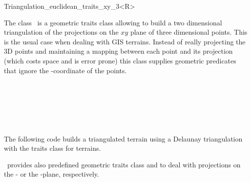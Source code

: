 

\begin{ccRefClass}{Triangulation_euclidean_traits_xy_3<R>}  %


\ccDefinition
  
The class \ccRefName\ is a geometric traits class allowing to
build a two dimensional triangulation of the projections
on the $xy$ plane  of three dimensional points.
This is the usual case when dealing with GIS terrains.
Instead of really projecting the 3D points and
maintaining a mapping between each point and its projection
 (which costs space and is error prone)
this class supplies geometric predicates that ignore the
-coordinate of the points.


\ccIsModel
{} \\


\ccTypes
{}
\ccGlue
{}
\ccGlue
{}


\ccSeeAlso
{} \\
 \\
\\


\ccExample
The following code builds a triangulated terrain
using a Delaunay triangulation with the traits class for 
terrains.


\cgal\ provides also predefined geometric traits class
 and
 to
deal with projections on the
 - or  the -plane,
respectively.

\\


\end{ccRefClass}


